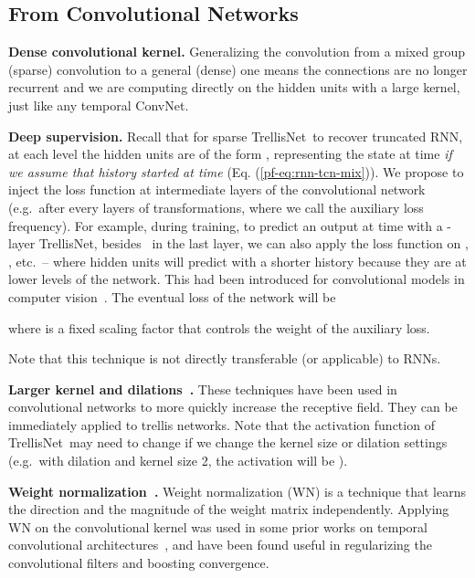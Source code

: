 \documentclass{article} \usepackage{iclr2019_conference,times}
\newcommand\mypara[1]{\vspace{0mm}\noindent\textbf{#1}}
\newcommand{\model}{TrellisNet}
\begin{document}
\subsection{From Convolutional Networks}
\label{appendix:from-tcns}

\mypara{Dense convolutional kernel.} Generalizing the convolution from a mixed group (sparse) convolution to a general (dense) one means the connections are no longer recurrent and we are computing directly on the hidden units with a large kernel, just like any temporal ConvNet.

\mypara{Deep supervision.} Recall that for sparse \model~to recover truncated RNN, at each level the hidden units are of the form , representing the state at time  \emph{if we assume that history started at time } (Eq. (\ref{pf-eq:rnn-tcn-mix})). We propose to inject the loss function at intermediate layers of the convolutional network (e.g.\ after every  layers of transformations, where we call  the auxiliary loss frequency). For example, during training, to predict an output at time  with a -layer \model, besides \small\normalsize~in the last layer, we can also apply the loss function on \small, \normalsize, etc.~-- where hidden units will predict with a shorter history because they are at lower levels of the network. This had been introduced for convolutional models in computer vision~\citep{lee2015deeply,xie2015holistically}. The eventual loss of the network will be

where  is a fixed scaling factor that controls the weight of the auxiliary loss.

Note that this technique is not directly transferable (or applicable) to RNNs.

\mypara{Larger kernel and dilations~\citep{dilatedConv}.} These techniques have been used in convolutional networks to more quickly increase the receptive field. They can be immediately applied to trellis networks. Note that the activation function  of \model~may need to change if we change the kernel size or dilation settings (e.g.\ with dilation  and kernel size 2, the activation will be \small\normalsize).

\mypara{Weight normalization~\citep{Salimans2016}.} Weight normalization (WN) is a technique that learns the direction and the magnitude of the weight matrix independently. Applying WN on the convolutional kernel was used in some prior works on temporal convolutional architectures~\citep{dauphinGatedConv,bai2018empirical}, and have been found useful in regularizing the convolutional filters and boosting convergence.
\end{document}
